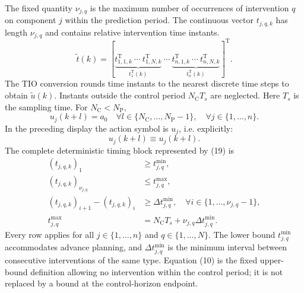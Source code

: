 \documentclass{article}
\begin{document}
The fixed quantity $\nu_{j,q}$ is the maximum number of occurrences of intervention $q$ on component $j$ within the prediction period. The continuous vector $t_{j,q,k}$ has length $\nu_{j,q}$ and contains relative intervention time instants.
\begin{equation}
\tilde t(k)=\left[
\underbrace{t_{1,1,k}^{\mathrm T}\ \cdots\ t_{1,N,k}^{\mathrm T}}_{t_1^{\mathrm T}(k)}\ \cdots\
\underbrace{t_{n,1,k}^{\mathrm T}\ \cdots\ t_{n,N,k}^{\mathrm T}}_{t_n^{\mathrm T}(k)}
\right]^{\mathrm T}.\tag{6}
\end{equation}
The TIO conversion rounds time instants to the nearest discrete time steps to obtain $\tilde u(k)$. Instants outside the control period $N_{\mathrm C}T_s$ are neglected. Here $T_s$ is the sampling time. For $N_{\mathrm C}<N_{\mathrm P}$,
\[
u_j(k+l)=a_0\quad
\forall l\in\{N_{\mathrm C},\ldots,N_{\mathrm P}-1\},\quad
\forall j\in\{1,\ldots,n\}.
\]
In the preceding display the action symbol is $u_j$, i.e. explicitly:
\[
u_j(k+l)\equiv u_j(k+l).
\]
The complete deterministic timing block represented by (19) is
\begin{align}
(t_{j,q,k})_1&\geq t_{j,q}^{\min}, \tag{7}\\
(t_{j,q,k})_{\nu_{j,q}}&\leq t_{j,q}^{\max}, \tag{8}\\
(t_{j,q,k})_{i+1}-(t_{j,q,k})_i&\geq\Delta t_{j,q}^{\min},
\quad\forall i\in\{1,\ldots,\nu_{j,q}-1\}, \tag{9}\\
t_{j,q}^{\max}&=N_{\mathrm C}T_s+\nu_{j,q}\Delta t_{j,q}^{\min}. \tag{10}
\end{align}
Every row applies for all $j\in\{1,\ldots,n\}$ and $q\in\{1,\ldots,N\}$. The lower bound $t_{j,q}^{\min}$ accommodates advance planning, and $\Delta t_{j,q}^{\min}$ is the minimum interval between consecutive interventions of the same type. Equation (10) is the fixed upper-bound definition allowing no intervention within the control period; it is not replaced by a bound at the control-horizon endpoint.
\end{document}
